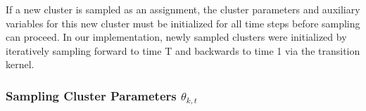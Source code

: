 \documentclass[twocolumn, final]{svjour3}
\begin{document}

If a new cluster is sampled as an assignment, the cluster parameters and auxiliary variables for this new cluster must be initialized for all time steps before sampling can proceed. In our implementation, newly sampled clusters were initialized by iteratively sampling forward to time T and backwards to time 1 via the transition kernel.



\subsubsection{Sampling Cluster Parameters $\theta_{k, t}$}
\end{document}
